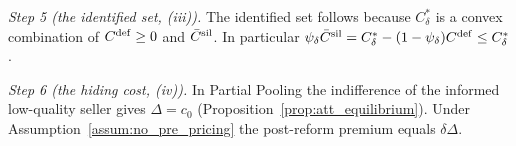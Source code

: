 \emph{Step 5 (the identified set, (iii)).} The identified set follows because $C^*_\delta$ is a convex combination of $C^{\rm def}\ge0$ and $\bar C^{\rm sil}$. In particular $\psi_\delta\bar C^{\rm sil}=C^*_\delta-(1-\psi_\delta)C^{\rm def}\le C^*_\delta$.

\emph{Step 6 (the hiding cost, (iv)).} In Partial Pooling the indifference of the informed low-quality seller gives $\Delta=c_0$ (Proposition~\ref{prop:att_equilibrium}). Under Assumption~\ref{assum:no_pre_pricing} the post-reform premium equals $\delta\Delta$.

